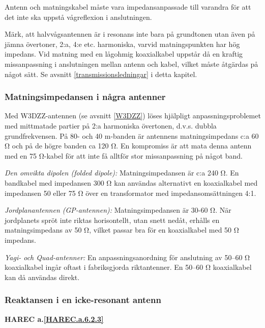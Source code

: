 Antenn och matningskabel måste vara impedansanpassade till varandra
för att det inte ska uppstå vågreflexion i anslutningen.

Märk, att halvvågsantennen är i resonans inte bara på grundtonen utan
även på jämna övertoner, 2:a, 4:e etc. harmoniska, varvid
matningspunkten har hög impedans.  Vid matning med en lågohmig
koaxialkabel uppstår då en kraftig missanpassning i anslutningen
mellan antenn och kabel, vilket måste åtgärdas på något sätt. Se
avsnitt \ref{transmissionsledningar} i detta kapitel.

\subsubsection{Matningsimpedansen i några antenner}

Med W3DZZ-antennen (se avsnitt \ref{W3DZZ}) löses hjälpligt anpassningsproblemet med
mittmatade partier på 2:a harmoniska övertonen, d.v.s. dubbla
grundfrekvensen. På 80- och 40 m-banden är antennens matningsimpedans
c:a 60 Ω och på de högre banden ca 120 Ω. En kompromiss är att mata
denna antenn med en 75 Ω-kabel för att inte få alltför stor
missanpassning på något band.

\emph{Den omvikta dipolen (folded dipole):}
Matningsimpedansen är c:a 240 Ω. En bandkabel med impedansen 300 Ω kan
användas alternativt en koaxialkabel med impedansen 50 eller 75 Ω över
en transformator med impedansomsättningen 4:1.

\emph{Jordplanantennen (GP-antennen):} Matningsimpedansen är 30-60
Ω. När jordplanets spröt inte riktas horisontellt, utan snett nedåt,
erhålls en matningsimpedans av 50 Ω, vilket passar bra för en
koaxialkabel med 50 Ω impedans.

\emph{Yagi- och Quad-antenner:} En anpassningsanordning för anslutning
av 50--60 Ω koaxialkabel ingår oftast i fabriksgjorda
riktantenner. En 50--60 Ω koaxialkabel kan då användas direkt.

\subsubsection{Reaktansen i en icke-resonant antenn}
\textbf{
HAREC a.\ref{HAREC.a.6.2.3}\label{myHAREC.a.6.2.3}
}

